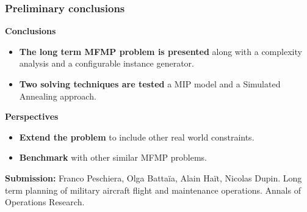 
\begin{frame}
\frametitle{\textbf{Preliminary conclusions}}
  \begin{block}{\textbf{Conclusions}}
    \begin{itemize}
    \item \textbf{The long term MFMP problem is presented}
      along with a complexity analysis and a configurable instance generator.
      
    \item \textbf{Two solving techniques are tested}
      a MIP model and a Simulated Annealing approach.
      
    \end{itemize}
  \end{block}  
  \pause
  \begin{block}{\textbf{Perspectives}}
    \begin{itemize}
      \item \textbf{Extend the problem} to include other real world constraints.
        
      \item \textbf{Benchmark} with other similar MFMP problems.
        
    \end{itemize}
  \end{block}
  \pause
  \textbf{Submission:} Franco Peschiera, Olga Battaïa, Alain Haït, Nicolas Dupin. Long term planning of military aircraft flight and maintenance operations. Annals of Operations Research.
\end{frame}
